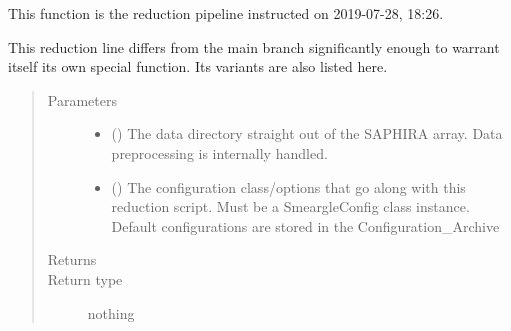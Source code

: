 \documentclass[letterpaper,10pt,english]{sphinxmanual}
\begin{document}
\begin{fulllineitems}
\label{\detokenize{python_docstrings/IfA_Smeargle.zulu.detector_pipelines.saphira_pipeline:IfA_Smeargle.zulu.detector_pipelines.saphira_pipeline.SA201907281826_reduction_pipeline}}
This function is the reduction pipeline instructed on 2019-07-28,
18:26.

This reduction line differs from the main branch significantly enough to
warrant itself its own special function. Its variants are also listed here.
\begin{quote}\begin{description}
\item[{Parameters}] \leavevmode\begin{itemize}
\item {} 
 () \textendash{} The data directory straight out of the SAPHIRA array. Data
preprocessing is internally handled.

\item {} 
 () \textendash{} The configuration class/options that go along with this reduction
script. Must be a SmeargleConfig class instance. Default
configurations are stored in the Configuration\_Archive

\end{itemize}

\item[{Returns}] \leavevmode


\item[{Return type}] \leavevmode
nothing

\end{description}\end{quote}

\end{fulllineitems}

\end{document}
